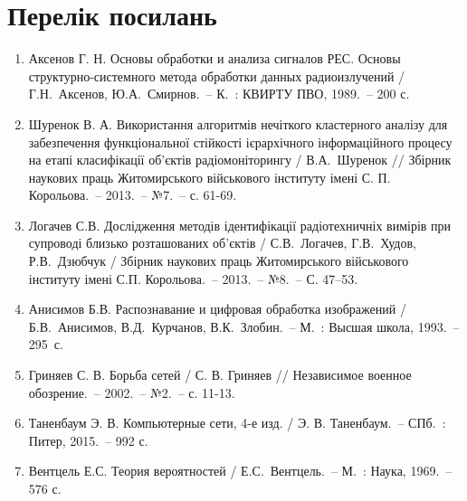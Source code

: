 \section*{Перелік посилань}
\begin{enumerate}\footnotesize
		
	\item Аксенов Г. Н. Основы обработки и анализа сигналов РЕС. Основы структурно-системного метода обработки данных радиоизлучений / Г.Н.~Аксенов,  Ю.А.~Смирнов.~--  К.~: КВИРТУ ПВО, 1989.~-- 200 с.
	\item Шуренок В. А. Використання алгоритмів нечіткого кластерного аналізу для забезпечення функціональної стійкості ієрархічного інформаційного процесу на етапі класифікації об’єктів радіомоніторингу / В.А.~Шуренок // Збірник наукових праць Житомирського військового інституту імені С. П. Корольова.~-- 2013.~-- №7.~-- с. 61-69.
	\item Логачев С.В. Дослідження методів ідентифікації радіотехничніх вимірів при супроводі близько розташованих об’єктів / С.В.~Логачев, Г.В.~Худов, Р.В.~Дзюбчук  / Збірник наукових праць Житомирського військового інституту імені С.П. Корольова.~-- 2013.~-- №8.~-- С. 47--53.  
	\item Анисимов Б.В. Распознавание и цифровая обработка изображений  / Б.В.~Анисимов, В.Д.~Курчанов, В.К.~Злобин.~-- М.~: Высшая школа, 1993.~-- 295~с. 
	\item Гриняев С. В.  Борьба сетей /  С. В. Гриняев // Независимое военное обозрение.~-- 2002.~-- №2.~-- с. 11-13.
	\item Таненбаум Э. В. Компьютерные сети, 4-е изд. / Э. В. Таненбаум.~-- СПб.~: Питер, 2015.~-- 992 с.
	\item Вентцель Е.С. Теория вероятностей  /  Е.С.~Вентцель.~-- М.~: Наука, 1969.~-- 576 с.
\end{enumerate}

\renewcommand{\refname}{References}

